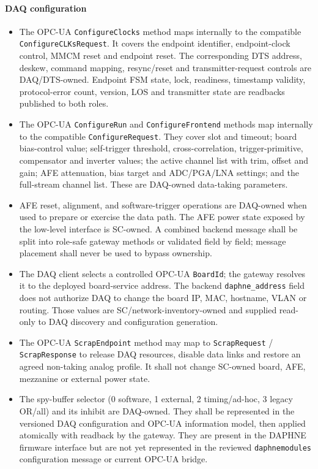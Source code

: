 \paragraph{DAQ configuration}
\begin{itemize}[nosep]
  \item The OPC-UA \texttt{ConfigureClocks} method maps internally to the compatible \texttt{ConfigureCLKs}\allowbreak\texttt{Request}. It covers the endpoint identifier, endpoint-clock control, MMCM reset and endpoint reset. The corresponding DTS address, deskew, command mapping, resync/reset and transmitter-request controls are DAQ/DTS-owned. Endpoint FSM state, lock, readiness, timestamp validity, protocol-error count, version, LOS and transmitter state are readbacks published to both roles.
  \item The OPC-UA \texttt{ConfigureRun} and \texttt{Configure}\allowbreak\texttt{Frontend} methods map internally to the compatible \texttt{ConfigureRequest}. They cover slot and timeout; board bias-control value; self-trigger threshold, cross-correlation, trigger-primitive, compensator and inverter values; the active channel list with trim, offset and gain; AFE attenuation, bias target and ADC/PGA/LNA settings; and the full-stream channel list. These are DAQ-owned data-taking parameters.
  \item AFE reset, alignment, and software-trigger operations are DAQ-owned when used to prepare or exercise the data path. The AFE power state exposed by the low-level interface is SC-owned. A combined backend message shall be split into role-safe gateway methods or validated field by field; message placement shall never be used to bypass ownership.
  \item The DAQ client selects a controlled OPC-UA \texttt{BoardId}; the gateway resolves it to the deployed board-service address. The backend \texttt{daphne\_address} field does not authorize DAQ to change the board IP, MAC, hostname, VLAN or routing. Those values are SC/network-inventory-owned and supplied read-only to DAQ discovery and configuration generation.
  \item The OPC-UA \texttt{ScrapEndpoint} method may map to \texttt{ScrapRequest} / \texttt{ScrapResponse} to release DAQ resources, disable data links and restore an agreed non-taking analog profile. It shall not change SC-owned board, AFE, mezzanine or external power state.
  \item The spy-buffer selector (0 software, 1 external, 2 timing/ad-hoc, 3 legacy OR/all) and its inhibit are DAQ-owned. They shall be represented in the versioned DAQ configuration and OPC-UA information model, then applied atomically with readback by the gateway. They are present in the DAPHNE firmware interface but are not yet represented in the reviewed \texttt{daphnemodules} configuration message or current OPC-UA bridge.
\end{itemize}

